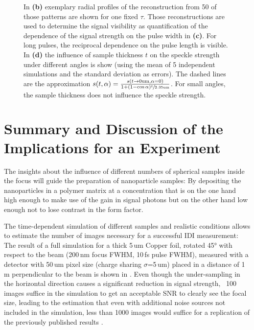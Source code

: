 \begin{figure}
{	In \textbf{(b)} exemplary radial profiles of the reconstruction from 50 of those patterns are shown for one fixed $\tau$. Those reconstructions are used to determine the signal visibility as quantification of the  dependence of the signal strength on the pulse width in \textbf{(c)}. For long pulses, the reciprocal dependence on the pulse length is visible.
	In \textbf{(d)}  the influence of sample thickness $t$ on the speckle strength under different angles is show (using the mean of 5 independent simulations and the standard deviation as errors). The dashed lines are the approximation $s(t,\alpha)=\frac{s(t\rightarrow0\text{um}, \alpha= 0)}{1+\left(1-\cos{\alpha}\right)\sfrac{t}{2.35\text{um}}}$. For small angles, the sample thickness does not influence the speckle strength.}
\end{figure}



\section{Summary and Discussion of the Implications for an Experiment}

The insights about the influence of different numbers of spherical samples inside the focus will guide the preparation of nanoparticle samples: By depositing the nanoparticles in a polymer matrix at a concentration that is on the one hand high enough to make use of the gain in signal photons but on the other hand low enough not to lose contrast in the form factor.



The time-dependent simulation of different samples and realistic conditions allows to estimate the number of images necessary for a successful IDI measurement: The result of a full simulation for a thick 5\,um Copper foil, rotated 45° with respect to the beam (200\,nm focus FWHM, 10\,fs pulse FWHM), measured with a detector with 50\,um pixel size (charge sharing $\sigma$=5\,um) placed in a distance of 1\,m perpendicular to the beam is shown in . Even though the under-sampling in the horizontal direction causes a significant reduction in signal strength, ~100 images suffice in the simulation to get an acceptable SNR to clearly see the focal size, leading to the estimation that even with additional noise sources not included in the simulation, less than 1000 images would suffice for a replication of the previously published results \cite{nakumura2020}.


